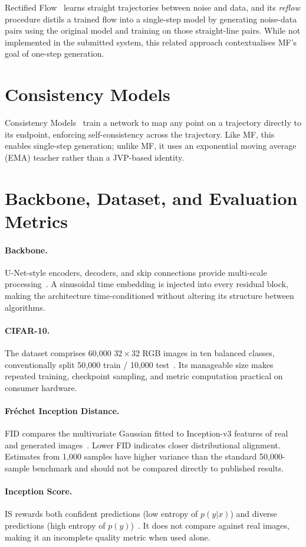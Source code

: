 Rectified Flow~\cite{liu2022flow} learns straight trajectories between noise
and data, and its \emph{reflow} procedure distils a trained flow into a
single-step model by generating noise-data pairs using the original model and
training on those straight-line pairs. While not implemented in the submitted
system, this related approach contextualises MF's goal of one-step generation.

\section{Consistency Models}

Consistency Models~\cite{song2023consistency} train a network to map any point
on a trajectory directly to its endpoint, enforcing self-consistency across the
trajectory. Like MF, this enables single-step generation; unlike MF, it uses an
exponential moving average (EMA) teacher rather than a JVP-based identity.

\section{Backbone, Dataset, and Evaluation Metrics}

\paragraph{Backbone.}
U-Net-style encoders, decoders, and skip connections provide multi-scale
processing~\cite{ronneberger2015unet}. A sinusoidal time embedding is injected
into every residual block, making the architecture time-conditioned without
altering its structure between algorithms.

\paragraph{CIFAR-10.}
The dataset comprises 60{,}000 $32\!\times\!32$ RGB images in ten balanced
classes, conventionally split 50{,}000 train / 10{,}000 test~\cite{krizhevsky2009learning}.
Its manageable size makes repeated training, checkpoint sampling, and metric
computation practical on consumer hardware.

\paragraph{Fr\'echet Inception Distance.}
FID compares the multivariate Gaussian fitted to Inception-v3 features of real
and generated images~\cite{heusel2017gans}. Lower FID indicates closer
distributional alignment. Estimates from 1{,}000 samples have higher variance
than the standard 50{,}000-sample benchmark and should not be compared directly
to published results.

\paragraph{Inception Score.}
IS rewards both confident predictions (low entropy of $p(y|x)$) and diverse
predictions (high entropy of $p(y)$)~\cite{salimans2016improved}. It does not
compare against real images, making it an incomplete quality metric when used
alone.
